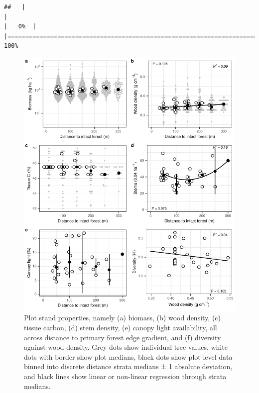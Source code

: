 \documentclass[
  12pt,
]{article}
\begin{document}
\begin{verbatim}
##   |                                                                              |                                                                      |   0%  |                                                                              |======================================================================| 100%
\end{verbatim}

\begin{figure}
\centering
\includegraphics{merge_files/figure-latex/biomass-1.pdf}
\caption{\label{fig:biomass} Plot stand properties, namely (a) biomass, (b) wood density, (c) tissue carbon, (d) stem density, (e) canopy light availability, all across distance to primary forest edge gradient, and (f) diversity against wood density. Grey dots show individual tree values, white dots with border show plot medians, black dots show plot-level data binned into discrete distance strata medians ± 1 absolute deviation, and black lines show linear or non-linear regression through strata medians.}
\end{figure}
\end{document}

